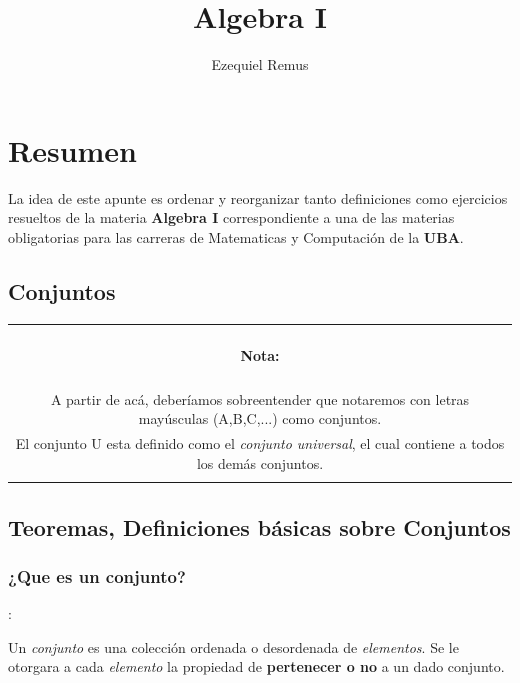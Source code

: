 \documentclass[10pt]{article}
\title{\bfseries \huge {Algebra I}}
\author{Ezequiel Remus}
\date{}
\begin{document}
\renewcommand{\tablename}{Tabla}
\maketitle
\newpage
\section*{Resumen}
La idea de este apunte es ordenar y reorganizar tanto definiciones como ejercicios resueltos de la materia \textbf{Algebra I} correspondiente a una de las materias 
obligatorias para las carreras de Matematicas y Computación de la \textbf{UBA}. 
\tableofcontents
\newpage

\begin{center}
\section{Conjuntos} 
\end{center}

\begin{table}[H]
	\begin{tabular}{||c||}
	\hline \\
	\sffamily
	\begin{Large}
	\textbf{Nota:}
	\end{Large}
	\\\\		
	\sffamily A partir de acá, deberíamos sobreentender que notaremos con letras mayúsculas (A,B,C,...) como conjuntos.\\ \sffamily El conjunto U esta definido como el \textit{conjunto universal}, el cual contiene a todos los demás conjuntos.
	\\\\ \hline 	
	\end{tabular}			
\end{table}		


\subsection{Teoremas, Definiciones básicas sobre Conjuntos} 


\subsubsection{¿Que es un conjunto?}
\begin{defi}:

Un \textit{conjunto} es una colección ordenada o desordenada de \textit{elementos}. Se le otorgara a cada \textit{elemento} la propiedad de \textbf{pertenecer o no} a un dado conjunto. 
\end{defi}
\end{document}
